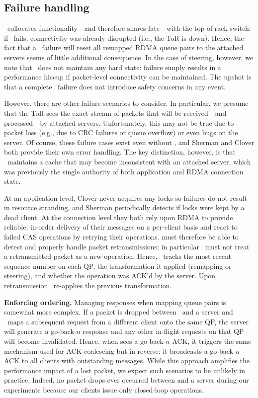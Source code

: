 \subsection{Failure handling}

\sword\ collocates functionality---and therefore shares fate---with the
top-of-rack switch: if \sword\ fails, connectivity was already
disrupted (i.e., the ToR is down).  Hence, the fact that a
\sword\ failure will reset all remapped RDMA queue pairs to the
attached servers seems of little additional consequence.  In the case
of steering, however, we note that \sword\ does not maintain any hard
state: failure simply results in a performance hiccup if packet-level
connectivity can be maintained.  The upshot is that a complete
\sword\ failure does not introduce safety concerns in any event.

However, there are other failure scenarios to consider.  In
particular, we presume that the ToR sees the exact stream of packets
that will be received---and processed---by attached servers.
Unfortunately, this may not be true due to packet loss (e.g., due to
CRC failures or queue overflow) or even bugs on the server.  Of
course, these failure cases exist even without \sword, and Sherman and
Clover both provide their own error handling.  The key distinction,
however, is that \sword\ maintains a cache that may become
inconsistent with an attached server, which was previously the single
authority of both application and RDMA connection state.


At an application level, Clover never acquires any locks so failures
do not result in resource stranding, and Sherman periodically detects
if locks were kept by a dead client.  At the connection level they
both rely upon RDMA to provide reliable, in-order delivery of their
messages on a per-client basis and react to failed CAS operations by
retrying their operations.  {\sword} must therefore be able to detect
and properly handle packet retransmissions; in particular \sword\ must
not treat a retransmitted packet as a new operation.  Hence,
\sword\ tracks the most recent sequence number on each QP, the
transformation it applied (remapping or steering), and whether the
operation was ACK'd by the server.  Upon retransmission
\sword\ re-applies the previous transformation.


\textbf{Enforcing ordering.}
Managing responses when mapping queue pairs is somewhat more complex.  If a
packet is dropped between \sword\ and a server and \sword\ maps a subsequent
request from a different client onto the same QP, the server will generate a
go-back-$n$ response and any other in-flight requests on that QP will become
invalidated.  Hence, when {\sword} sees a go-back-$n$ ACK, it triggers the same
mechanism used for ACK coalescing but in reverse: it broadcasts a go-back-$n$
ACK to all clients with outstanding messages.  While this approach amplifies the
performance impact of a lost packet, we expect such scenarios to be unlikely in
practice.  Indeed, no packet drops ever occurred between {\sword} and a server
during our experiments because our clients issue only closed-loop operations.

